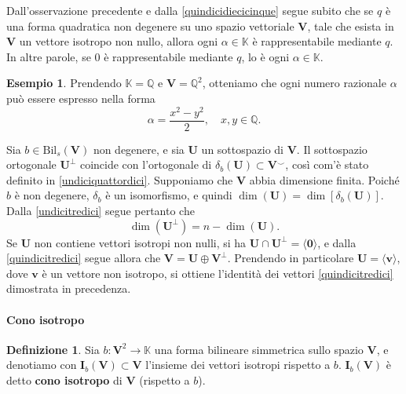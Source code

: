 \documentclass{article}
\theoremstyle{plain}
\theoremstyle{definition}
\newtheorem{defn}{Definizione}[section]
\newtheorem{exmp}{Esempio}[section]
\theoremstyle{remark}
\begin{document}
\vspace{10pt}

Dall'osservazione precedente e dalla \ref{quindicidiecicinque} segue subito che se $q$ è una forma quadratica 
non degenere su uno spazio vettoriale $\mathbf{V}$, tale che esista in $\mathbf{V}$ un vettore isotropo non 
nullo, allora ogni $\alpha \in \mathbb{K}$ è rappresentabile mediante $q$. In altre parole, se $0$ è 
rappresentabile mediante $q$, lo è ogni $\alpha \in \mathbb{K}$.

\vspace{10pt}

\begin{exmp}
Prendendo $\mathbb{K} = \mathbb{Q}$ e $\mathbf{V} =\mathbb{Q}^2$, otteniamo che ogni numero razionale 
$\alpha$ può essere espresso nella forma
\[\alpha = \dfrac{x^2 - y^2}{2}, \quad  x, y \in \mathbb{Q}.\]    
\end{exmp}

\vspace{10pt}

Sia $b\in\mathrm{Bil}_s(\mathbf{V})$ non degenere, e sia $\mathbf{U}$ un sottospazio di $\mathbf{V}$. Il sottospazio ortogonale 
$\mathbf{U}^\perp$ coincide con l'ortogonale di $\delta_b(\mathbf{U})\subset\mathbf{V}^\smallsmile$, così com'è stato definito in \ref{undiciquattordici}. 
Supponiamo che $\mathbf{V}$ abbia dimensione finita. Poiché $b$ è non degenere, $\delta_b$ è un isomorfismo, 
e quindi $\dim(\mathbf{U})=\dim[\delta_b(\mathbf{U})]$. Dalla \ref{undicitredici} segue pertanto che
\begin{equation}\label{quindicitredici}
\dim(\mathbf{U}^\perp) = n - \dim(\mathbf{U}). 
\end{equation}
Se $\mathbf{U}$ non contiene vettori isotropi non nulli, si ha $\mathbf{U} \cap \mathbf{U}^\perp = \langle\mathbf{0}\rangle$, 
e dalla \ref{quindicitredici} segue allora che $\mathbf{V} = \mathbf{U}\oplus\mathbf{V}^\perp$. Prendendo in particolare 
$\mathbf{U} = \langle \mathbf{v} \rangle$, dove $\mathbf{v}$ è un vettore non isotropo, si ottiene l'identità 
dei vettori \ref{quindicitredici} dimostrata in precedenza.

\vspace{10pt}

\paragraph{Cono isotropo}
\begin{bxthm}
\begin{defn}
Sia $b: \mathbf{V}^2 \to \mathbb{K}$ una forma bilineare simmetrica sullo spazio $\mathbf{V}$, e denotiamo 
con $\mathbf{I}_b(\mathbf{V}) \subset \mathbf{V}$ l'insieme dei vettori isotropi rispetto a $b$. 
$\mathbf{I}_b(\mathbf{V})$ è detto \textbf{cono isotropo} di $\mathbf{V}$ (rispetto a $b$).     
\end{defn}
\end{bxthm}
\end{document}
